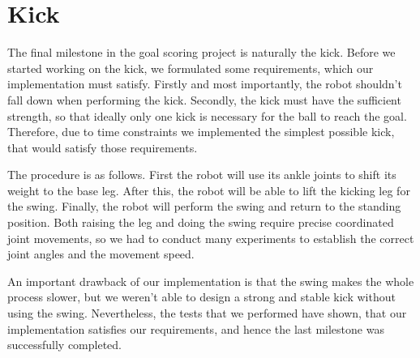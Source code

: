 \section{Kick}

The final milestone in the goal scoring project is naturally the kick. Before
we started working on the kick, we formulated some requirements, which our
implementation must satisfy. Firstly and most importantly, the robot shouldn't
fall down when performing the kick. Secondly, the kick must have the sufficient
strength, so that ideally only one kick is necessary for the ball to reach the
goal. Therefore, due to time constraints we implemented the simplest possible
kick, that would satisfy those requirements.

The procedure is as follows. First the robot will use its ankle joints to shift
its weight to the base leg. After this, the robot will be able to lift the
kicking leg for the swing. Finally, the robot will perform the swing and return
to the standing position. Both raising the leg and doing the swing require
precise coordinated joint movements, so we had to conduct many experiments to
establish the correct joint angles and the movement speed.

An important drawback of our implementation is that the swing makes the whole
process slower, but we weren't able to design a strong and stable kick without
using the swing. Nevertheless, the tests that we performed have shown, that our
implementation satisfies our requirements, and hence the last milestone was
successfully completed.

